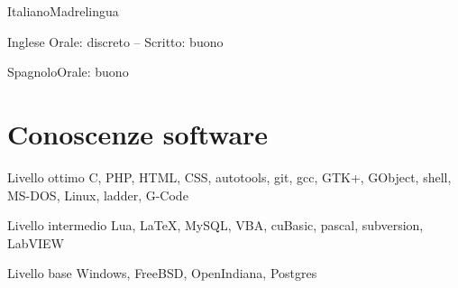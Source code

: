 \documentclass{tccv}
\begin{document}
\begin{minipage}[t]{0.44\linewidth}
\begin{factlist}
\item{Italiano}{Madrelingua}
\item{Inglese} {Orale: discreto -- Scritto: buono}
\item{Spagnolo}{Orale: buono}
\end{factlist}

\section{Conoscenze software}

\begin{factlist}

\item{Livello ottimo}
     {C, PHP, HTML, CSS, autotools, git, gcc, GTK+, GObject, shell,
      MS-DOS, Linux, ladder, G-Code}

\item{Livello intermedio}
     {Lua, \LaTeX, MySQL, VBA, cuBasic, pascal, subversion, LabVIEW}

\item{Livello base}
     {Windows, FreeBSD, OpenIndiana, Postgres}

\end{factlist}

\end{minipage}
\end{document}

